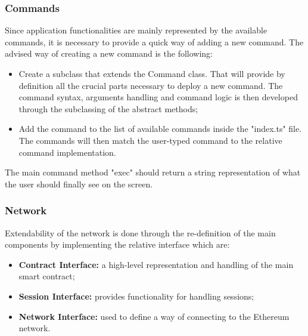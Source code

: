 \subsubsection{Commands}
Since application functionalities are mainly represented by the available commands, it is necessary to provide a quick way of adding a new command.
The advised way of creating a new command is the following:
\begin{itemize}
	\item Create a subclass that extends the Command class. That will provide by definition all the crucial parts necessary to deploy a new command. The command syntax, arguments handling and command logic is then developed through the subclassing of the abstract methods;
	\item Add the command to the list of available commands inside the "index.ts" file. The commands will then match the user-typed command to the relative command implementation.
\end{itemize}
The main command method "exec" should return a string representation of what the user should finally see on the screen.
\subsubsection{Network}
Extendability of the network is done through the re-definition of the main components by implementing the relative interface which are:
\begin{itemize}
	\item \textbf{Contract Interface:} a high-level representation and handling of the main smart contract;
	\item \textbf{Session Interface:} provides functionality for handling sessions;
	\item \textbf{Network Interface:} used to define a way of connecting to the Ethereum network.
\end{itemize}

